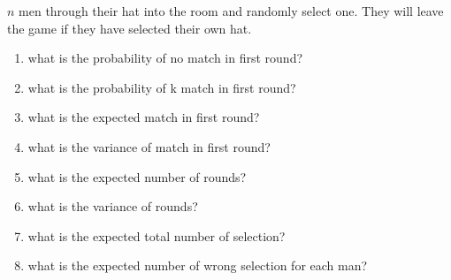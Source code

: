 \begin{example}
    $n$ men through their hat into the room and randomly select one. They will leave the game if they have selected their own hat.
    \begin{enumerate}
        \item \label{hatq1} what is the probability of no match in first round?
        \item \label{hatq2} what is the probability of k match in first round?
        \item \label{hatq3} what is the expected match in first round?
        \item \label{hatq4} what is the variance of match in first round?
        \item \label{hatq5} what is the expected number of rounds?
        \item \label{hatq6} what is the variance of rounds?
        \item \label{hatq7} what is the expected total number of selection?
        \item \label{hatq8} what is the expected number of wrong selection for each man?
    \end{enumerate}    
\end{example}
